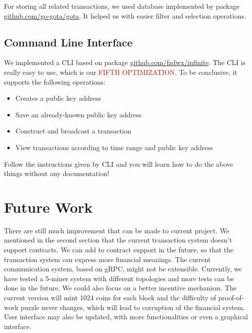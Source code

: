 \documentclass{article}
\begin{document}
\begin{spacing}{1.1}
For storing all related transactions, we used database implemented by package \url{github.com/go-gota/gota}. It helped us with easier filter and selection operations.

\subsection{Command Line Interface}

We implemented a CLI based on package \url{github.com/fzdwx/infinite}. The CLI is really easy to use, which is our \textcolor{red}{FIFTH OPTIMIZATION}. To be conclusive, it supports the following operations:
\begin{itemize}
    \setlength{\itemsep}{1pt}
    \item Creates a public key address
    \item Save an already-known public key address
    \item Construct and broadcast a transaction
    \item View transactions according to time range and public key address
\end{itemize}
Follow the instructions given by CLI and you will learn how to do the above things without any documentation!

\section{Future Work}

There are still much improvement that can be made to current project. We mentioned in the second section that the current transaction system doesn't support contracts. We can add to contract support in the future, so that the transaction system can express more financial meanings. The current communication system, based on gRPC, might not be extensible. Currently, we have tested a 5-miner system with different topologies and more tests can be done in the future. We could also focus on a better incentive mechanism. The current version will mint 1024 coins for each block and the difficulty of proof-of-work puzzle never changes, which will lead to corruption of the financial system. User interface may also be updated, with more functionalities or even a graphical interface.




\end{spacing}
\end{document}
